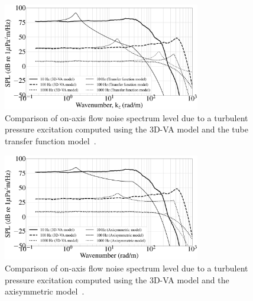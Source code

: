 \documentclass[11pt,cleanfoot]{asme2ej}
\begin{document}
\begin{figure}[ht]
    \centering
    \includegraphics[width=3.4in]{Inside_pressure_comparison_3d_and_approx.eps}
    \caption{Comparison of on-axis flow noise spectrum level due to a turbulent pressure excitation computed using the 3D-VA model and the tube transfer function model~\cite{knight1996}.} 
    \label{3d vs approx}
\end{figure}
\begin{figure}[ht]
    \centering
    \includegraphics[width=3.4in]{Inside_pressure_comparison_3d_and_axi.eps}
    \caption{Comparison of on-axis flow noise spectrum level due to a turbulent pressure excitation computed using the 3D-VA model and the axisymmetric model~\cite{jineesh2013}.}
    \label{3d vs axi}
\end{figure}
\end{document}
